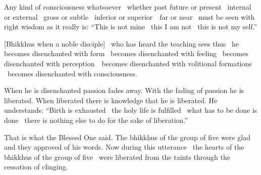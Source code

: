 Any kind of consciousness whatsoever \breathmark\ whether past future or present \breathmark\ internal or external \breathmark\ gross or subtle \breathmark\ inferior or \mbox{superior}~\breathmark\ far or near \breathmark\ must be seen with right wisdom as it really is: ``This is not mine \breathmark\ this I am not \breathmark\ this is not my self.''

[Bhikkhus when a noble disciple]
\breathmark\ who has heard the teaching
sees thus \breathmark\ he becomes disenchanted with form \breathmark\ becomes disenchanted with feeling \breathmark\ becomes disenchanted with \mbox{perception}~\breathmark\ becomes disenchanted with volitional formations \breathmark\ becomes disenchanted with consciousness.

When he is disenchanted passion fades away. With the fading of passion he is liberated. When liberated there is knowledge that he is liberated. He understands: ``Birth is exhausted \breathmark\ the holy life is fulfilled \breathmark\ what has to be done is done \breathmark\ there is nothing else to do for the sake of liberation.''

That is what the Blessed One said. The bhikkhus of the group of five were glad and they approved of his words. Now during this utterance \breathmark\ the hearts of the bhikkhus of the group of five \breathmark\ were liberated from the taints through the cessation of clinging.

\suttaRef{[SN 22.59]}

